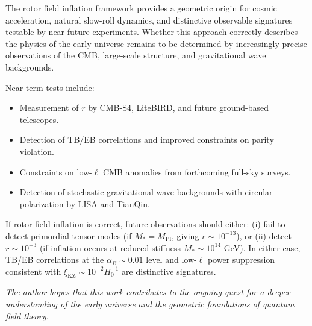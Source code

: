 \documentclass[11pt,a4paper]{article}
\numberwithin{equation}{section}
\theoremstyle{plain}
\theoremstyle{definition}
\theoremstyle{remark}
\newif\ifack
\begin{document}
The rotor field inflation framework provides a geometric origin for cosmic acceleration, natural slow-roll dynamics, and distinctive observable signatures testable by near-future experiments. Whether this approach correctly describes the physics of the early universe remains to be determined by increasingly precise observations of the CMB, large-scale structure, and gravitational wave backgrounds.

Near-term tests include:
\begin{itemize}
  \item Measurement of $r$ by CMB-S4, LiteBIRD, and future ground-based telescopes.
  \item Detection of TB/EB correlations and improved constraints on parity violation.
  \item Constraints on low-$\ell$ CMB anomalies from forthcoming full-sky surveys.
  \item Detection of stochastic gravitational wave backgrounds with circular polarization by LISA and TianQin.
\end{itemize}

If rotor field inflation is correct, future observations should either: (i) fail to detect primordial tensor modes (if $M_* = M_{\mathrm{Pl}}$, giving $r \sim 10^{-13}$), or (ii) detect $r \sim 10^{-3}$ (if inflation occurs at reduced stiffness $M_* \sim 10^{14}$ GeV). In either case, TB/EB correlations at the $\alpha_B \sim 0.01$ level and low-$\ell$ power suppression consistent with $\xi_{\mathrm{KZ}} \sim 10^{-2}H_0^{-1}$ are distinctive signatures.

\medskip
\noindent\textit{The author hopes that this work contributes to the ongoing quest for a deeper understanding of the early universe and the geometric foundations of quantum field theory.}

\ifack
\section*{Acknowledgements}
The author is indebted to the pioneering work of David Hestenes, Anthony Lasenby, and Chris Doran in developing geometric algebra as a language for physics. Thanks are due to the Planck, BICEP/Keck, and LIGO collaborations for making data publicly available. This work was conducted independently without external funding.
\fi

\appendix
\end{document}
